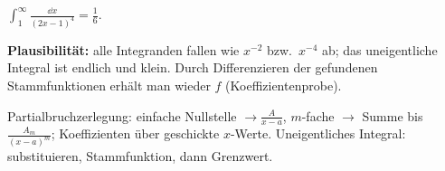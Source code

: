 \begin{ergebnis}
$\displaystyle\int_1^\infty\frac{\dd x}{(2x-1)^4}=\frac16 .$
\end{ergebnis}

\begin{kontrolle}
\textbf{Plausibilität:} alle Integranden fallen wie $x^{-2}$ bzw.\ $x^{-4}$
ab; das uneigentliche Integral ist endlich und klein. Durch Differenzieren
der gefundenen Stammfunktionen erhält man wieder $f$ (Koeffizientenprobe).
\end{kontrolle}

\begin{merksatz}
Partialbruchzerlegung: einfache Nullstelle $\to\frac{A}{x-a}$, $m$-fache
$\to$ Summe bis $\frac{A_m}{(x-a)^m}$; Koeffizienten über geschickte
$x$-Werte. Uneigentliches Integral: substituieren, Stammfunktion, dann
Grenzwert.
\end{merksatz}
